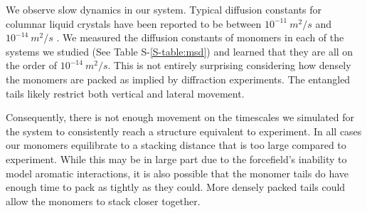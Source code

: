 \documentclass[journal=jpcbfk,manusciprt=article]{achemso}
\begin{document}
  We observe slow dynamics in our system. Typical diffusion constants for columnar
  liquid crystals have been reported to be between $10^{-11}~ m^2/s$ 
  \cite{dong_translational_1984} and $10^{-14}~m^2/s$ \cite{dvinskikh_molecular_2002}. 
  We measured the diffusion constants of monomers in each of the systems we studied 
  (See Table S-\ref{S-table:msd}) and learned that they are all on the order of 
  $10^{-14}~m^2/s$. This is not entirely surprising considering how densely the 
  monomers are packed as implied by diffraction experiments. The entangled tails 
  likely restrict both vertical and lateral movement.
  


  Consequently, there is not enough movement on the timescales we simulated for the system to 
  consistently reach a structure equivalent to experiment. In all cases our monomers
  equilibrate to a stacking distance that is too large compared to experiment. 
  While this may be in large part due to the forcefield's inability to model aromatic
  interactions, it is also possible that the monomer tails do have enough time to pack 
  as tightly as they could. More densely packed tails could allow the monomers to stack
  closer together. 
  
\end{document}
